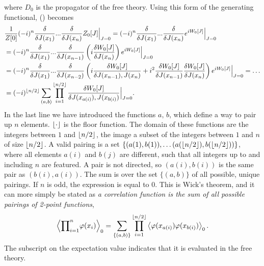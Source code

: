 where $D_0$ is the propagator of the free theory.
Using this form of the generating functional, 
()
becomes
\begin{align*}
    & \frac{1}{Z[0]}  (-i)^n\fdv{}{J(x_1)} ... \fdv{}{J(x_n)} Z_0[J]  \Big|_{J = 0}
    = (-i)^n \fdv{}{J(x_1)} ... \fdv{}{J(x_n)} e^{i W_0[J]} \Big|_{J = 0}\\
    & = (-i)^{n} \fdv{}{J(x_1)} ... \fdv{}{J(x_{n-1})} \left(i \fdv{W_0[J]}{ J(x_{n}) } \right) e^{i W_0[J]} \Big|_{J = 0}\\
    & = (-i)^{n}\fdv{}{J(x_1)} ... \fdv{}{J(x_{n-2})}
    \left(
        i\fdv{ W_0[J] }{ J(x_{n-1}), J(x_{n}) }
        + i^2 \fdv{W_0[J]}{J(x_{n-1})} \fdv{W_0[J]}{J(x_{n})}
    \right) 
    e^{i W_0[J]} \Big|_{J = 0}
    = \dots \\
    &= 
    (- i )^{\floor{n/2}}\sum_{{(a, b)}} \prod_{i=1}^{\floor{n/2}}
    \fdv{ W_0[J] }{ J(x_{a(i)}), J(x_{b(i)}) } \Big|_{J = 0}.
\end{align*}
In the last line we have introduced the functions $a, \, b$, which define a way to pair up $n$ elements.
$\lfloor\cdot\rfloor$ is the floor function.
The domain of these functions are the integers between $1$ and $\lfloor n/2\rfloor$, the image a subset of the integers between $1$ and $n$ of size $\lfloor n/2\rfloor$.
A valid pairing is a set $\{(a(1), b(1)), \dots (a(\lfloor n/2\rfloor), b(\lfloor n/2\rfloor))\}$, where all elements $a(i)$ and $b(j)$ are different, such that all integers up to and including $n$ are featured.
A pair is not directed, so $(a(i), b(i))$ is the same pair as $(b(i), a(i))$.
The sum is over the set ${\{(a, b)\}}$ of all possible, unique pairings.
If $n$ is odd, the expression is equal to $0$.
This is Wick's theorem, and it can more simply be stated as \emph{a correlation function is the sum of all possible pairings of 2-point functions},
\begin{equation}
    \left\langle {\prod}_{i=1}^{n} \varphi(x_i)   \right\rangle_0
    = \sum_{\{(a, b)\}}  \prod_{i=1}^{\lfloor n/2\rfloor}  \left\langle \varphi(x_{a(i)}) \varphi(x_{b(i)}) \right\rangle_0.
\end{equation}
The subscript on the expectation value indicates that it is evaluated in the free theory.

